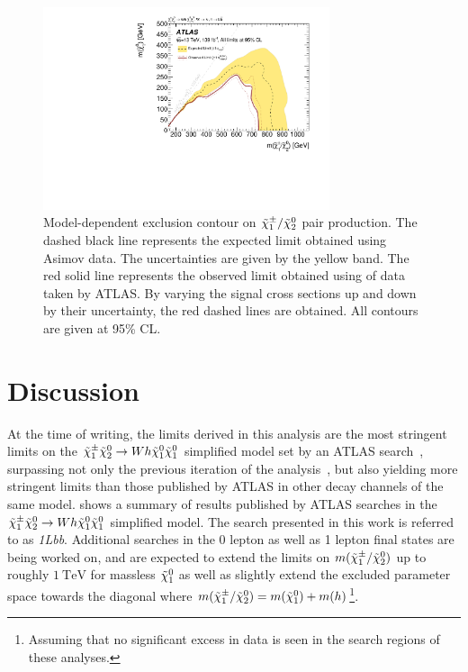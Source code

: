  \begin{figure}
	\centering\includegraphics[width=0.75\textwidth]{contourPlotterWh1Lbb}
	\caption{Model-dependent exclusion contour on $\tilde{\chi}_1^\pm/\tilde{\chi}_2^0$ pair production. The dashed black line represents the expected limit obtained using Asimov data. The uncertainties are given by the yellow band. The red solid line represents the observed limit obtained using \onethirtynineifb of data taken by ATLAS. By varying the signal cross sections up and down by their uncertainty, the red dashed lines are obtained. All contours are given at 95\% CL. }
	\label{fig:result_exclusion}
\end{figure}


\section{Discussion}

At the time of writing, the limits derived in this analysis are the most stringent limits on the $\tilde{\chi}_1^\pm\tilde{\chi}_2^0\rightarrow Wh\tilde{\chi}_1^0\tilde{\chi}_1^0$ simplified model set by an ATLAS search~\cite{ATL-PHYS-PUB-2020-020}, surpassing not only the previous iteration of the analysis~\cite{asds}, but also yielding more stringent limits than those published by ATLAS in other decay channels of the same model.  shows a summary of results published by ATLAS searches in the $\tilde{\chi}_1^\pm\tilde{\chi}_2^0\rightarrow Wh\tilde{\chi}_1^0\tilde{\chi}_1^0$ simplified model. The search presented in this work is referred to as \textit{1Lbb}. Additional searches in the 0 lepton as well as 1 lepton final states are being worked on, and are expected to extend the limits on $m(\tilde{\chi}_1^\pm/\tilde{\chi}_2^0)$ up to roughly $\SI{1}{\TeV}$ for massless $\tilde{\chi}_1^0$ as well as slightly extend the excluded parameter space towards the diagonal where $m(\tilde{\chi}_1^\pm/\tilde{\chi}_2^0) = m(\tilde{\chi}_1^0) + m(h)$\footnote{Assuming that no significant excess in data is seen in the search regions of these analyses.}.

